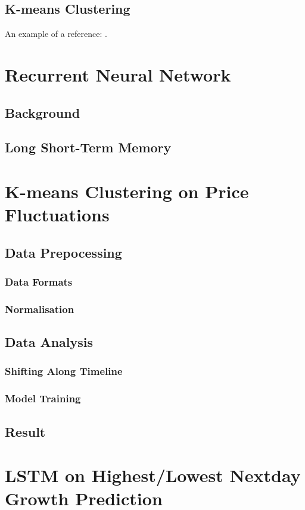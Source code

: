 \documentclass[11pt]{article} %
\theoremstyle{plain}
\theoremstyle{definition}
\begin{document}
\subsection{K-means Clustering}

An example of a reference:
\cite{adam/dpapa:2017}.

\section{Recurrent Neural Network}
\subsection{Background}
\subsection{Long Short-Term Memory}

\section{K-means Clustering on Price Fluctuations}
\subsection{Data Prepocessing}
\subsubsection{Data Formats}
\subsubsection{Normalisation}
\subsection{Data Analysis}
\subsubsection{Shifting Along Timeline}
\subsubsection{Model Training}
\subsection{Result}

\clearpage

\section{LSTM on Highest/Lowest Nextday Growth Prediction}
\end{document}
